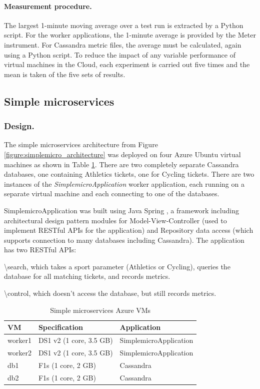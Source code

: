 \documentclass[runningheads]{llncs}
\begin{document}
\paragraph{Measurement procedure.} The largest 1-minute moving average over a test run is extracted by a Python script.  For the worker applications, the 1-minute average is provided by the Meter instrument.  For Cassandra metric files, the average must be calculated, again using a Python script.  To reduce the impact of any variable performance of virtual machines in the Cloud, each experiment is carried out five times and the mean is taken of the five sets of results.

%
%
\FloatBarrier
\subsection{Simple microservices}

\subsubsection{Design.}  The simple microservices architecture from Figure \ref{figure:simplemicro_architecture} was deployed on four Azure Ubuntu virtual machines as shown in Table \ref{table:builtmicro_vmdesign}.  There are two completely separate Cassandra databases, one containing Athletics tickets, one for Cycling tickets.  There are two instances of the {\itshape SimplemicroApplication} worker application, each running on a separate virtual machine and each connecting to one of the databases.

SimplemicroApplication was built using Java Spring \cite{RN1076}, a framework including architectural design pattern modules for Model-View-Controller (used to implement RESTful APIs for the application) and Repository data access (which supports connection to many databases including Cassandra).  The application has two RESTful APIs:

{\textbackslash search}, which takes a sport parameter (Athletics or Cycling), queries the database for all matching tickets, and records metrics.

{\textbackslash control}, which doesn't access the database, but still records metrics.

\begin{table}[h!]
	\centering
	\caption{Simple microservices Azure VMs}
	\label{table:builtmicro_vmdesign}
	\begin{tabular}{l | l | l}
		VM		& Specification		& Application \\
		\hline
		worker1	& DS1 v2 (1 core, 3.5 GB)	& SimplemicroApplication \\
		worker2	& DS1 v2 (1 core, 3.5 GB)	& SimplemicroApplication \\
		db1		& F1s (1 core, 2 GB)	& Cassandra \\
		db2		& F1s (1 core, 2 GB)	& Cassandra \\
	\end{tabular}
\end{table}
\end{document}
